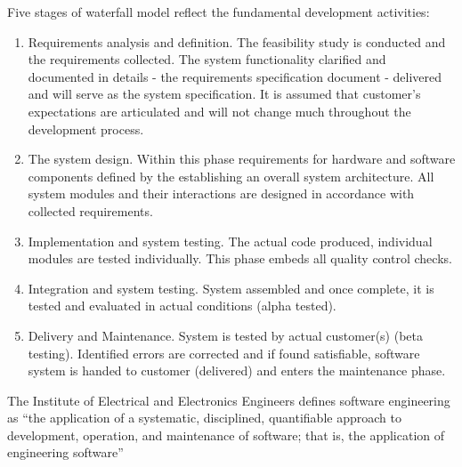 Five stages of waterfall model reflect the fundamental development activities:
\begin{enumerate}
 \item Requirements analysis and definition. The feasibility study is conducted 
and the requirements collected. The system functionality clarified and
documented in details - the requirements specification document - delivered  
and will serve as the system specification. It is assumed that customer's 
expectations are articulated and will not change much throughout the development 
process.
 \item The system design. Within this phase requirements for hardware and 
software components defined by the establishing an overall system architecture.
All system modules and their interactions are designed in accordance with 
collected requirements.
 \item Implementation and system testing. The actual code produced, individual 
modules are tested individually. This phase embeds all quality control checks.
 \item Integration and system testing. System assembled and once complete, it
is tested and evaluated in actual conditions (alpha tested).
 \item Delivery and Maintenance. System is tested by actual customer(s) 
(beta testing). Identified errors are corrected and if found satisfiable, 
software system is handed to customer (delivered) and enters the maintenance 
phase. 
\end{enumerate}



The Institute of Electrical and Electronics Engineers defines software engineering as 
“the application of a systematic, disciplined, quantifiable approach to development, 
operation, and maintenance of software; that is, the application of engineering software”
